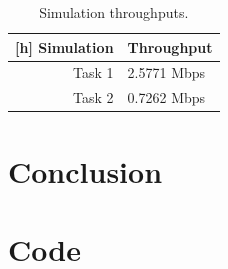 \documentclass[twocolumn]{article}
\begin{document}
\begin{table}
\centering
\caption{Simulation throughputs.}

\begin{tabular}{r l}[h]
Simulation & Throughput \\ \hline
Task 1 & 2.5771 Mbps \\
Task 2 & 0.7262 Mbps
\end{tabular}
\end{table}


\section{Conclusion}

\onecolumn
\appendix
\section{Code}

\end{document}
